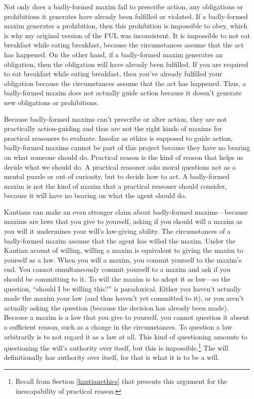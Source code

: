 \begin{isabellebody}
\begin{isamarkuptext}
Not only does a badly-formed maxim fail to prescribe action, any obligations or prohibitions it 
generates have already been fulfilled or violated. If a badly-formed maxim generates a prohibition, 
then this prohibition is impossible to obey, which is why my original version of the FUL was inconsistent. 
It is impossible to not eat breakfast while eating breakfast, because the circumstances assume that the 
act has happened. On the other hand, if a badly-formed maxim generates an obligation, then the obligation 
will have already been fulfilled. If you are required to eat breakfast while eating breakfast, then you've 
already fulfilled your obligation because the circumstances assume that the act has happened. Thus, 
a badly-formed maxim does not actually guide action because it doesn't generate new obligations or 
prohibitions. 

Because badly-formed maxims can't prescribe or alter action, they are not practically action-guiding and 
thus are not the right kinds of maxims for practical reasoners to evaluate. Insofar as ethics 
is supposed to guide action, badly-formed maxims cannot be part of this project because they
have no bearing on what someone should do. Practical reason is the kind of reason that helps us decide 
what we should do. A practical reasoner asks moral questions not as a mental puzzle or out of curiosity, but 
to decide how to act. A badly-formed maxim is not the kind of maxim that a practical reasoner should consider, because it
will have no bearing on what the agent should do.

Kantians can make an even stronger claim about badly-formed maxims—because maxims are laws that you 
give to yourself, asking if you should will a maxim as you will it undermines your will's law-giving 
ability. The circumstances of a badly-formed maxim assume that the agent has willed the maxim. Under 
the Kantian acount of willing, willing a maxim is equivalent to giving the maxim to yourself as a law. 
When you will a maxim, you commit yourself to the maxim's end. You cannot simultaneously 
commit yourself to a maxim and ask if you should be committing to it. To will the maxim is to adopt it as 
law—so the question, ``should I be willing this?'' is paradoxical. Either you haven't actually made 
the maxim your law (and thus haven't yet committed to it), or you aren't actually asking 
the question (because the decision has already been made). Because a maxim is a law that you give to 
yourself, you cannot question it absent a sufficient reason, such as a change in the circumstances. 
To question a law arbitrarily is to not regard it as a law at all. This kind of questioning amounts to 
questioning the will's authority over itself, but this is impossible.\footnote{Recall from Section \ref{kantianethics} 
that \citet{velleman} presents this argument for the inescapability of practical reason.} The will 
definitionally has authority over itself, for that is what it is to be a will. 


\end{isamarkuptext}
\end{isabellebody}
